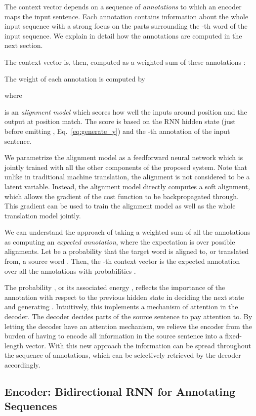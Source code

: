 The context vector  depends on a sequence of {\em annotations}  to which an encoder maps the input sentence.  Each annotation
 contains information about the whole input sequence with a strong focus
on the parts surrounding the -th word of the input sequence. We explain in
detail how the annotations are computed in the next section.

The context vector  is, then, computed as a weighted sum of these
annotations :

The weight  of each annotation  is computed by 

where

is an {\it alignment model} which scores how well the inputs around
position  and the output at position  match. The score is based on
the RNN hidden state  (just before emitting ,
Eq.~\eqref{eq:generate_y}) and the -th annotation  of the input
sentence.

We parametrize the alignment model  as a feedforward neural network which is
jointly trained with all the other components of the proposed system.  Note
that unlike in traditional machine translation, the alignment is not considered
to be a latent variable. Instead, the alignment model directly computes a soft
alignment, which allows the gradient of the cost function to be backpropagated
through. This gradient can be used to train the alignment model as well as the
whole translation model jointly.

We can understand the approach of taking a weighted sum of all the annotations
as computing an {\em expected annotation}, where the expectation is over
possible alignments.  Let  be a probability that the target word
 is aligned to, or translated from, a source word . Then, the -th
context vector  is the expected annotation over all the annotations with
probabilities .

The probability , or its associated energy , reflects the
importance of the annotation  with respect to the previous hidden state
 in deciding the next state  and generating .  Intuitively,
this implements a mechanism of attention in the decoder. The decoder decides
parts of the source sentence to pay attention to. By letting the decoder have an
attention mechanism, we relieve the encoder from the burden of having to encode
all information in the source sentence into a fixed-length vector. With this new
approach the information can be spread throughout the sequence of annotations,
which can be selectively retrieved by the decoder accordingly.

\subsection{Encoder: Bidirectional RNN for Annotating Sequences}
\label{sec:birnn_encoder}

